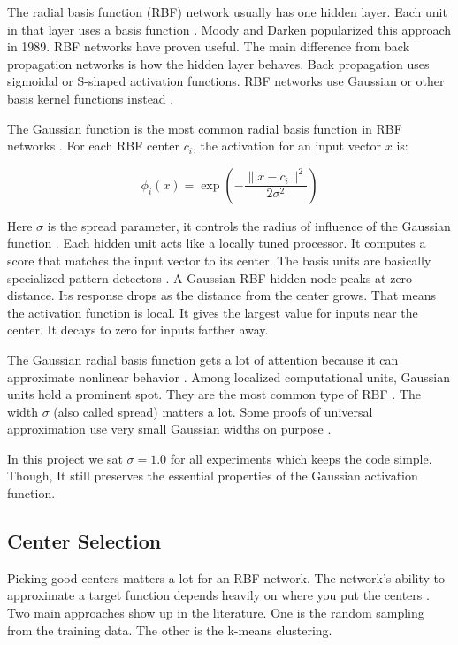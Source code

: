 \documentclass[12pt]{article}
\begin{document}
	The radial basis function (RBF) network usually has one hidden layer. Each unit in that layer uses a basis function \cite{moody1989}. Moody and Darken popularized this approach in 1989. RBF networks have proven useful. The main difference from back propagation networks is how the hidden layer behaves. Back propagation uses sigmoidal or S-shaped activation functions. RBF networks use Gaussian or other basis kernel functions instead \cite{moody1989}.
	
	The Gaussian function is the most common radial basis function in RBF networks \cite{park1991}. For each RBF center $c_i$, the activation for an input vector $x$ is:
	
	\begin{equation}
		\phi_i(x) = \exp\left(-\frac{\|x - c_i\|^2}{2\sigma^2}\right)
		\label{eq:gaussian}
	\end{equation}
	
	Here $\sigma$ is the spread parameter, it controls the radius of influence of the Gaussian function \cite{broomhead1988}. Each hidden unit acts like a locally tuned processor. It computes a score that matches the input vector to its center. The basis units are basically specialized pattern detectors \cite{moody1989}. A Gaussian RBF hidden node peaks at zero distance. Its response drops as the distance from the center grows. That means the activation function is local. It gives the largest value for inputs near the center. It decays to zero for inputs farther away.
	
	The Gaussian radial basis function gets a lot of attention because it can approximate nonlinear behavior \cite{girosi1990}. Among localized computational units, Gaussian units hold a prominent spot. They are the most common type of RBF \cite{park1991}. The width $\sigma$ (also called spread) matters a lot. Some proofs of universal approximation use very small Gaussian widths on purpose \cite{park1991}.
	
	In this project we sat $\sigma = 1.0$ for all experiments which keeps the code simple. Though, It still preserves the essential properties of the Gaussian activation function.
	
\subsection{Center Selection}

Picking good centers matters a lot for an RBF network. The network's ability to approximate a target function depends heavily on where you put the centers \cite{soper2023}. Two main approaches show up in the literature. One is the random sampling from the training data. The other is the k-means clustering\cite{soper2023}.
\end{document}
